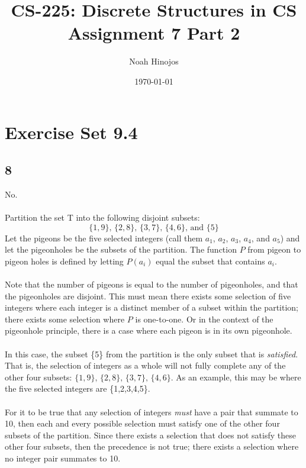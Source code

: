 \documentclass[12pt]{article}
\title{
  \textbf{CS-225: Discrete Structures in CS} \\
  Assignment 7 Part 2
  }
\author{Noah Hinojos}
\date{\today}
\begin{document}
\maketitle
\section*{Exercise Set 9.4}
\subsection*{8}

No.
\\ \\
Partition the set T into the following disjoint subsets:
\\
$$ \{1,9\}\text{, }\{2,8\}\text{, }\{3,7\}\text{, }\{4,6\}\text{, and }\{5\}$$
Let the pigeons be the five selected integers (call them $a_1$, $a_2$, $a_3$, $a_4$, and $a_5$) 
and let the pigeonholes be the subsets of the partition. 
The function $P$ from pigeon to pigeon holes is defined by letting $P(a_i)$ equal the subset that contains $a_i$.
\\ \\
Note that the number of pigeons is equal to the number of pigeonholes, and that the pigeonholes are disjoint. This must mean there exists some selection of five integers where each integer is a distinct member of a subset within the partition; there exists some selection where $P$ is one-to-one. Or in the context of the pigeonhole principle, there is a case where each pigeon is in its own pigeonhole.
\\ \\
In this case, the subset \{5\} from the partition is the only subset that is \textit{satisfied}. That is, the selection of integers as a whole will not fully complete any of the other four subsets: $\{1,9\}\text{, }\{2,8\}\text{, }\{3,7\}\text{, }\{4,6\}$. As an example, this may be where the five selected integers are \{1,2,3,4,5\}.
\\ \\
For it to be true that any selection of integers \textit{must} have a pair that summate to 10, then each and every possible selection must satisfy one of the other four subsets of the partition. Since there exists a selection that does not satisfy these other four subsets, then the precedence is not true; there exists a selection where no integer pair summates to 10.

\newpage
\end{document}

